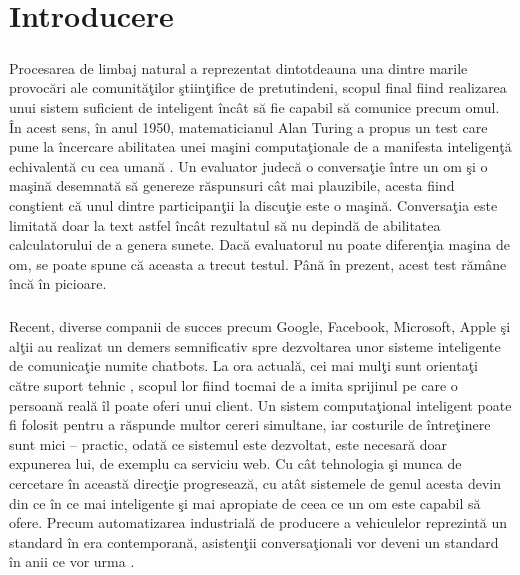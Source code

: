 \chapter{Introducere}

\paragraph{}
Procesarea de limbaj natural a reprezentat dintotdeauna una dintre marile provoc\u ari ale comunit\u a\c tilor \c stiin\c tifice de pretutindeni, scopul final fiind realizarea unui sistem suficient de inteligent \^ inc\^ at s\u a fie capabil s\u a comunice precum omul. \^ In acest sens, \^ in anul 1950, matematicianul Alan Turing a propus un test care pune la \^ incercare abilitatea unei ma\c sini computa\c tionale de a manifesta inteligen\c t\u a echivalent\u a cu cea uman\u a \cite{sep-turing-test}. Un evaluator judec\u a o conversa\c tie \^ intre un om \c si o ma\c sin\u a desemnat\u a s\u a genereze r\u aspunsuri c\^ at mai plauzibile, acesta fiind con\c stient c\u a unul dintre participan\c tii la discu\c tie este o ma\c sin\u a. Conversa\c tia este limitat\u a doar la text astfel \^ inc\^ at rezultatul s\u a nu depind\u a de abilitatea calculatorului de a genera sunete. Dac\u a evaluatorul nu poate diferen\c tia ma\c sina de om, se poate spune c\u a aceasta a trecut testul. P\^ an\u a \^ in prezent, acest test r\u am\^ ane \^ inc\u a \^ in picioare.

\paragraph{}
Recent, diverse companii de succes precum Google, Facebook, Microsoft, Apple \c si al\c tii au realizat un demers semnificativ spre dezvoltarea unor sisteme inteligente de comunica\c tie numite chatbots. La ora actual\u a, cei mai mul\c ti sunt orienta\c ti c\u atre suport tehnic \cite{support-chat-bots}, scopul lor fiind tocmai de a imita sprijinul pe care o persoan\u a real\u a \^ il poate oferi unui client. Un sistem computa\c tional inteligent poate fi folosit pentru a r\u aspunde multor cereri simultane, iar costurile de \^ intre\c tinere sunt mici – practic, odat\u a ce sistemul este dezvoltat, este necesar\u a doar expunerea lui, de exemplu ca serviciu web. Cu c\^ at tehnologia \c si munca de cercetare \^ in aceast\u a direc\c tie progreseaz\u a, cu at\^ at sistemele de genul acesta devin din ce \^ in ce mai inteligente \c si mai apropiate de ceea ce un om este capabil s\u a ofere. Precum automatizarea industrial\u a de producere a vehiculelor reprezint\u a un standard \^ in era contemporan\u a, asisten\c tii conversa\c tionali vor deveni un standard \^ in anii ce vor urma \cite{business-chat-bots}.

